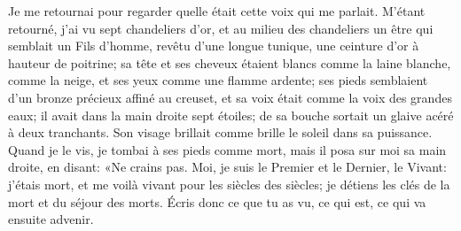 Je me retournai pour regarder quelle était cette voix qui me parlait.
M’étant retourné, j’ai vu sept chandeliers d’or,
	et au milieu des chandeliers un être qui semblait un Fils d’homme,
	revêtu d’une longue tunique, une ceinture d’or à hauteur de poitrine;
	sa tête et ses cheveux étaient blancs comme la laine blanche, comme la neige,
	et ses yeux comme une flamme ardente;
	ses pieds semblaient d’un bronze précieux affiné au creuset,
	et sa voix était comme la voix des grandes eaux;
	il avait dans la main droite sept étoiles;
	de sa bouche sortait un glaive acéré à deux tranchants.
Son visage brillait comme brille le soleil dans sa puissance.
Quand je le vis, je tombai à ses pieds comme mort,
	mais il posa sur moi sa main droite, en disant:
	«Ne crains pas.
Moi, je suis le Premier et le Dernier, le Vivant:
	j’étais mort, et me voilà vivant pour les siècles des siècles;
	je détiens les clés de la mort et du séjour des morts.
Écris donc ce que tu as vu, ce qui est, ce qui va ensuite advenir.
